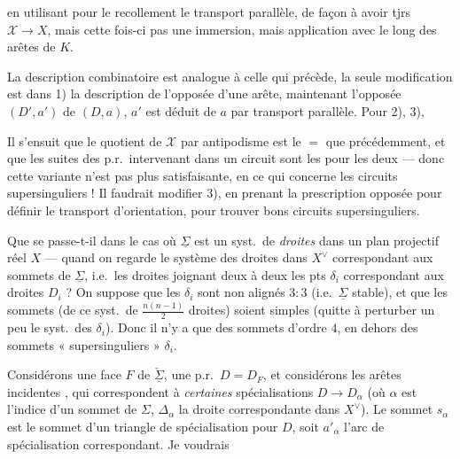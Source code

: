 \documentclass[11pt,a4paper]{article}
\begin{document}
en utilisant pour le recollement le transport parallèle, de façon  à avoir tjrs $\mathcal{X} \to X$, mais cette fois-ci pas une immersion, mais  application avec  le long des arêtes de $K$.

La description combinatoire est analogue à celle qui précède, la seule modification est dans 1) la description de l'opposée d'une arête, maintenant  l'opposée $(D', a')$ de $(D, a)$, $a'$ est déduit de $a$ par transport parallèle. Pour 2), 3), 

Il s'ensuit que le quotient de $\mathcal{X}$ par antipodisme est le $=$ que précédemment, et que les suites des p.r.\ intervenant dans un circuit sont les  \struck{\ill{}} pour les deux --- donc cette variante n'est pas plus satisfaisante, en ce qui concerne les circuits supersinguliers ! Il faudrait modifier 3), en prenant la prescription opposée pour définir le transport d'orientation, pour trouver  bons circuits supersinguliers.

Que se passe-t-il dans le cas où $\underline{\Sigma}$ est un syst.\ de \emph{droites} dans un  plan projectif réel $X$ --- quand on regarde le système des droites dans $X^{\vee}$ correspondant aux sommets de $\underline{\Sigma}$, i.e.\ les droites joignant deux à deux les pts $\delta_i$ correspondant aux droites $D_i$ ? On suppose que  les $\delta_i$ sont non alignés $3 : 3$ (i.e.\ $\underline{\Sigma}$ stable), et que les sommets  (de ce syst.\ de $\frac{n(n-1)}{2}$ droites) soient simples (quitte à perturber un peu le syst.\ des $\delta_i$). Donc il n'y a que des sommets d'ordre $4$, en dehors des sommets « supersinguliers » $\delta_i$.

Considérons une face $F$ de $\check{\underline{\Sigma}}$,  une p.r.\ $D = D_F$, et considérons les arêtes incidentes , qui correspondent à \emph{certaines} spécialisations $D \to D_\alpha$ (où $\alpha$ est l'indice d'un sommet  de $\Sigma$, $\Delta_\alpha$ la droite correspondante dans $X^{\vee}$). Le sommet $s_\alpha$ est le sommet d'un triangle de spécialisation pour $D$, soit $a'_\alpha$ l'arc de spécialisation correspondant. Je voudrais
\end{document}
